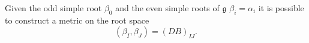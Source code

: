 Given the odd simple root $\beta_0$ and the even simple roots of $\mathfrak{g}$ $\beta_i=\alpha_i$ it is possible to construct a metric on the root space
\begin{equation}
    (\beta_I,\beta_J) = (DB)_{IJ}.
\end{equation}



